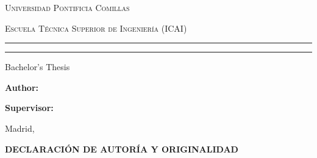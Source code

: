 \begin{titlepage}
\centering

\rule{0pt}{2.5cm}
\vspace{0.5cm}

{\scshape\Large Universidad Pontificia Comillas\par}
\vspace{0.2cm}
{\scshape\large Escuela Técnica Superior de Ingeniería (ICAI)\par}
\vspace{0.2cm}
{\scshape\normalsize \tfgdegree\par}

\vspace{1.5cm}
\rule{\linewidth}{0.5pt}
\vspace{0.8cm}

{\Huge\bfseries \tfgtitle \par}

\vspace{0.8cm}
\rule{\linewidth}{0.5pt}
\vspace{2cm}

{\Large Bachelor's Thesis\par}
\vspace{1.5cm}

\begin{flushright}
\begin{minipage}{0.6\textwidth}
\raggedleft
\textbf{Author:}\\
\tfgauthor

\vspace{0.8cm}

\textbf{Supervisor:}\\
\tfgtutor
\end{minipage}
\end{flushright}

\vfill

{\large Madrid, \tfgyear\par}

\end{titlepage}

\thispagestyle{plain}
\begin{center}
{\bfseries\large DECLARACIÓN DE AUTORÍA Y ORIGINALIDAD}
\end{center}


